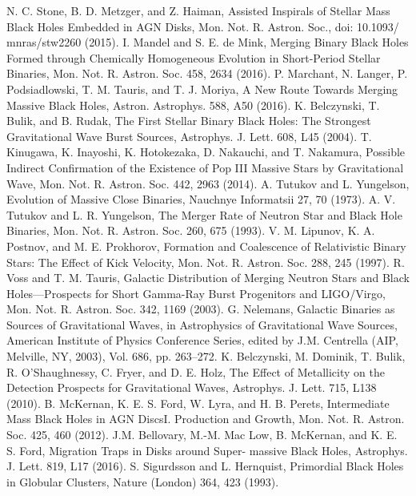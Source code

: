 \documentclass[binding=0.6cm, LaM]{sapthesis}
\begin{document}
\begin{thebibliography}{500}
 	 N. C. Stone, B. D. Metzger, and Z. Haiman, Assisted Inspirals of Stellar Mass Black Holes Embedded in AGN Disks, Mon. Not. R. Astron. Soc., doi: 10.1093/ mnras/stw2260 (2015).
        I. Mandel and S. E. de Mink, Merging Binary Black Holes Formed through Chemically Homogeneous Evolution in Short-Period Stellar Binaries, Mon. Not. R. Astron. Soc. 458, 2634 (2016).
          P. Marchant, N. Langer, P. Podsiadlowski, T. M. Tauris, and T. J. Moriya, A New Route Towards Merging Massive Black Holes, Astron. Astrophys. 588, A50 (2016).
     K. Belczynski, T. Bulik, and B. Rudak, The First Stellar Binary Black Holes: The Strongest Gravitational Wave Burst Sources, Astrophys. J. Lett. 608, L45 (2004).
        T. Kinugawa, K. Inayoshi, K. Hotokezaka, D. Nakauchi, and T. Nakamura, Possible Indirect Confirmation of the Existence of Pop III Massive Stars by Gravitational Wave, Mon. Not. R. Astron. Soc. 442, 2963 (2014).
          A. Tutukov and L. Yungelson, Evolution of Massive Close Binaries, Nauchnye Informatsii 27, 70 (1973).
          A. V. Tutukov and L. R. Yungelson, The Merger Rate of Neutron Star and Black Hole Binaries, Mon. Not. R. Astron. Soc. 260, 675 (1993).
         V. M. Lipunov, K. A. Postnov, and M. E. Prokhorov, Formation and Coalescence of Relativistic Binary Stars: The Effect of Kick Velocity, Mon. Not. R. Astron. Soc. 288, 245 (1997).
         R. Voss and T. M. Tauris, Galactic Distribution of Merging Neutron Stars and Black Holes—Prospects for Short Gamma-Ray Burst Progenitors and LIGO/Virgo, Mon. Not. R. Astron. Soc. 342, 1169 (2003).
         G. Nelemans, Galactic Binaries as Sources of Gravitational Waves, in Astrophysics of Gravitational Wave Sources, American Institute of Physics Conference Series, edited by J.M. Centrella (AIP, Melville, NY, 2003), Vol. 686, pp. 263–272.
          K. Belczynski, M. Dominik, T. Bulik, R. O’Shaughnessy, C. Fryer, and D. E. Holz, The Effect of Metallicity on the Detection Prospects for Gravitational Waves, Astrophys. J. Lett. 715, L138 (2010).
          B. McKernan, K. E. S. Ford, W. Lyra, and H. B. Perets, Intermediate Mass Black Holes in AGN DiscsI. Production and Growth, Mon. Not. R. Astron. Soc. 425, 460 (2012).
          J.M. Bellovary, M.-M. Mac Low, B. McKernan, and K. E. S. Ford, Migration Traps in Disks around Super- massive Black Holes, Astrophys. J. Lett. 819, L17 (2016).
          S. Sigurdsson and L. Hernquist, Primordial Black Holes in Globular Clusters, Nature (London) 364, 423 (1993).

\end{thebibliography}
\end{document}
